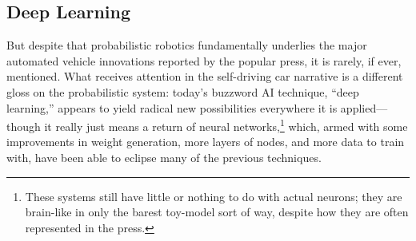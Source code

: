 \subsection{Deep Learning}

But despite that probabilistic robotics fundamentally
underlies the major automated vehicle innovations reported by the
popular press, it is rarely, if ever, mentioned. What receives attention in the
self-driving car narrative is a different gloss on the probabilistic
system: today's buzzword
AI technique, ``deep learning,'' appears to yield
radical new possibilities everywhere it is 
applied---though it really just means a return of neural
networks,\footnote{These systems still have little or nothing to do
  with actual neurons; they are brain-like in only the barest
  toy-model sort of way, despite how they are often represented in the
  press.} which, armed with some improvements in weight generation,
more layers of
nodes, and more data to train with, have been able to eclipse many of
the previous techniques. 


